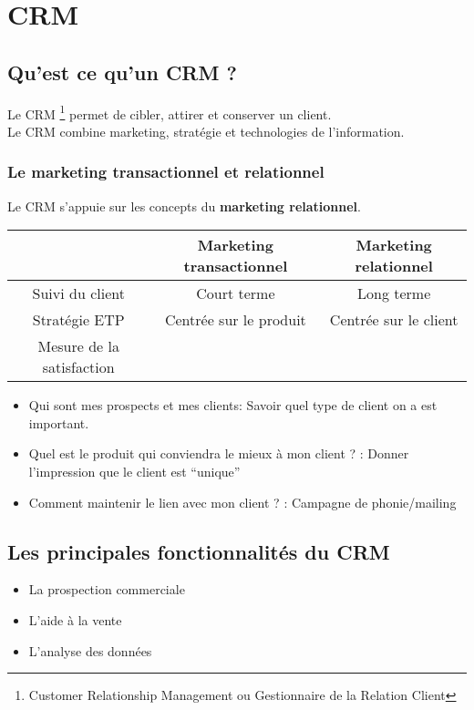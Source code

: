 \documentclass[12pt,a4paper,openany]{report}
\begin{document}
	\maketitle
	\chapter{CRM}
	\section{Qu'est ce qu'un CRM ?}
	Le CRM \footnote{Customer Relationship Management ou Gestionnaire de la Relation Client} 
	permet de cibler, attirer et conserver un client. \\
	Le CRM combine marketing, stratégie et technologies de l'information.
	\subsection{Le marketing transactionnel et relationnel}
	Le CRM s'appuie sur les concepts du \textbf{marketing relationnel}. \\
	\begin{center}
	\begin{tabular}{|c|c|c|}
		\hline
		& Marketing transactionnel & Marketing relationnel \\
		\hline
		Suivi du client & Court terme & Long terme\\
		\hline
		Stratégie ETP & Centrée sur le produit & Centrée sur le client \\
		\hline
		Mesure de la satisfaction & & \\
		\hline
	\end{tabular}	
\end{center}
	\begin{itemize}
		\item Qui sont mes prospects et mes clients: Savoir quel type de client on a est 
			important. \\
		\item Quel est le produit qui conviendra le mieux à mon client ? : Donner l'impression que 
			le client est ``unique''
		\item Comment maintenir le lien avec mon client ? : Campagne de phonie/mailing
	\end{itemize}
	\section{Les principales fonctionnalités du CRM}
	\begin{itemize}
		\item  La prospection commerciale
		\item L'aide à la vente
		\item L'analyse des données
	\end{itemize}
\end{document}
